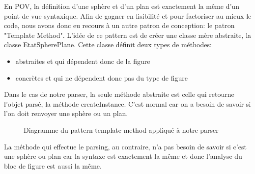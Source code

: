 \documentclass[../../Rapport RayTracer]{subfiles}
\begin{document}
En POV, la définition d'une sphère et d'un plan est exactement la même d'un point de vue syntaxique. 
Afin de gagner en lisibilité et pour factoriser au mieux le code, nous avons donc eu recours à un autre patron de conception: le patron "Template Method".
L'idée de ce pattern est de créer une classe mère abstraite, la classe EtatSpherePlane. Cette classe définit deux types de méthodes:

\begin{itemize}
\item abstraites et qui dépendent donc de la figure
\item concrètes et qui ne dépendent donc pas du type de figure
\end{itemize}

Dans le cas de notre parser, la seule méthode abstraite est celle qui retourne l'objet parsé, la méthode createInstance. C'est normal car on a besoin de savoir si
l'on doit renvoyer une sphère ou un plan.

\begin{figure}[h!]
	
	\caption{Diagramme du pattern template method appliqué à notre parser}
	\label{diagrammePatternTemplateMethod}
\end{figure}
\FloatBarrier

La méthode qui effectue le parsing, au contraire,  n'a pas besoin de savoir si c'est une sphère ou plan car la syntaxe est exactement la même et donc l'analyse du bloc de figure est aussi la même.
\end{document}

